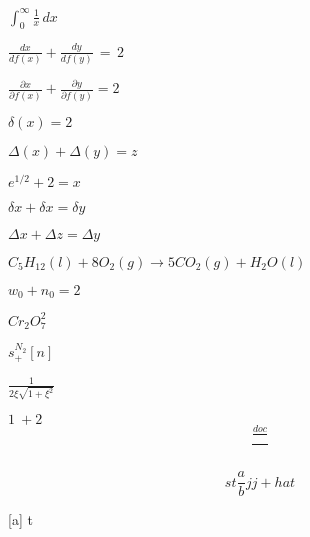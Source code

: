 \documentclass{article}
\begin{document}
$\int_0^{\infty} \frac{1}{x}\, dx$


$\frac{dx}{df(x)} + \frac{dy}{df(y)}\, =\, 2$


$\frac{\partial x}{\partial f(x)} + \frac{\partial y}{\partial f(y)} = 2$


$\delta (x) = 2$

$\Delta (x) + \Delta (y) = z$

$e^{1/2} + 2 = x$

$\delta x + \delta x = \delta y$

$\Delta x + \Delta z = \Delta y$

$C_5H_{12}(l)+8O_2(g)\rightarrow 5CO_2(g)+H_2O(l)$

$w_0 + n_0 = 2$

$Cr_2O_7^2$

$s^{N_2}_+ [n]$

$\frac{1}{2\xi \sqrt{1+\xi^2}}$

$1\: + 2$
\[
  \frac{ \frac{doc}{}}{}
\]

\[
  st
  \frac{a}{b}
jj+hat

\]

[a]
{t}
\end{document}
